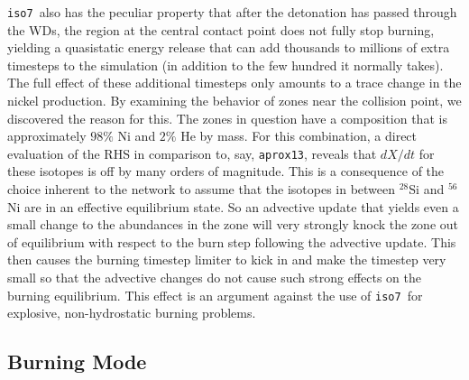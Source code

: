 \documentclass[twocolumn,numberedappendix]{../aastex6}
\newcommand{\isoseven}{\texttt{iso7}}
\newcommand{\aproxthirteen}{\texttt{aprox13}}
\begin{document}
\isoseven\ also has the peculiar property that after the detonation has passed through the WDs,
the region at the central contact point does not fully stop burning, yielding a quasistatic energy
release that can add thousands to millions of extra timesteps to the simulation (in addition to the few
hundred it normally takes). The full effect of these additional timesteps only amounts to a trace change
in the nickel production. By examining the behavior of zones near the collision point, we discovered the
reason for this. The zones in question have a composition that
is approximately $98\%$ Ni and $2\%$ He by mass. For this combination, a direct evaluation of the RHS in
comparison to, say, \aproxthirteen, reveals that $dX/dt$ for these isotopes is off by many orders of magnitude.
This is a consequence of the choice inherent to the network to assume that the isotopes in between $^{28}$Si
and $^{56}$Ni are in an effective equilibrium state. So an advective update that yields even a small change
to the abundances in the zone will very strongly knock the zone out of equilibrium with respect to the burn
step following the advective update. This then causes the burning timestep limiter to kick in and make the
timestep very small so that the advective changes do not cause such strong effects on the burning equilibrium.
This effect is an argument against the use of \isoseven\ for explosive, non-hydrostatic burning problems.



\subsection{Burning Mode}
\label{sec:parameters:burningmode}
\end{document}

